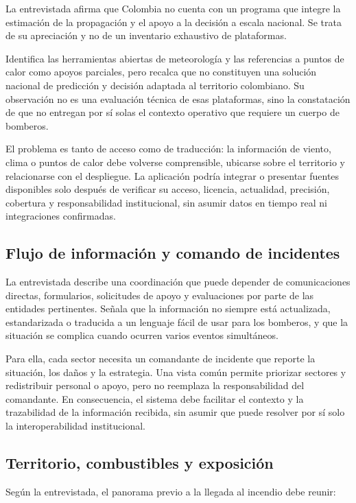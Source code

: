 La entrevistada afirma que Colombia no cuenta con un programa que integre la estimación de la propagación y el apoyo a la decisión a escala nacional. Se trata de su apreciación y no de un inventario exhaustivo de plataformas.

Identifica las herramientas abiertas de meteorología y las referencias a puntos de calor como apoyos parciales, pero recalca que no constituyen una solución nacional de predicción y decisión adaptada al territorio colombiano. Su observación no es una evaluación técnica de esas plataformas, sino la constatación de que no entregan por sí solas el contexto operativo que requiere un cuerpo de bomberos.

El problema es tanto de acceso como de traducción: la información de viento, clima o puntos de calor debe volverse comprensible, ubicarse sobre el territorio y relacionarse con el despliegue. La aplicación podría integrar o presentar fuentes disponibles solo después de verificar su acceso, licencia, actualidad, precisión, cobertura y responsabilidad institucional, sin asumir datos en tiempo real ni integraciones confirmadas.

\subsection{Flujo de información y comando de incidentes}

La entrevistada describe una coordinación que puede depender de comunicaciones directas, formularios, solicitudes de apoyo y evaluaciones por parte de las entidades pertinentes. Señala que la información no siempre está actualizada, estandarizada o traducida a un lenguaje fácil de usar para los bomberos, y que la situación se complica cuando ocurren varios eventos simultáneos.

Para ella, cada sector necesita un comandante de incidente que reporte la situación, los daños y la estrategia. Una vista común permite priorizar sectores y redistribuir personal o apoyo, pero no reemplaza la responsabilidad del comandante. En consecuencia, el sistema debe facilitar el contexto y la trazabilidad de la información recibida, sin asumir que puede resolver por sí solo la interoperabilidad institucional.

\subsection{Territorio, combustibles y exposición}

Según la entrevistada, el panorama previo a la llegada al incendio debe reunir:

